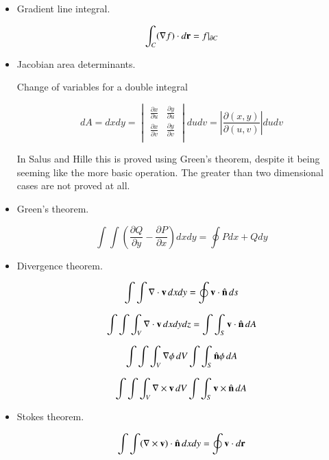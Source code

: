 \documentclass{article}
\newcommand{\grad}[0]{\nabla}
\newcommand{\PD}[2]{\frac{\partial {#2}}{\partial {#1}}}
\newcommand{\Abs}[1]{\left\lvert{#1}\right\rvert}
\begin{document}
\begin{itemize}

\item Gradient line integral. 

\begin{equation}\label{eqn:lineintegral}
\int_C (\grad f) \cdot d\Br = f \vert_{\partial C}
\end{equation}

\item Jacobian area determinants. 

Change of variables for a double integral

\begin{equation}
dA = dx dy =
\begin{vmatrix}
\PD{u}{x} & \PD{u}{y} \\
\PD{v}{x} & \PD{v}{y} \\
\end{vmatrix}
du dv
= \Abs{ \PD{(u,v)}{(x,y)} } du dv
\end{equation}

In Salus and Hille this is proved using Green's theorem, despite it 
being seeming like the more basic operation.  The greater than two
dimensional cases are not proved at all.

\item Green's theorem. 

\begin{equation}\label{eqn:greens}
\int\int \left(\PD{y}{Q} - \PD{x}{P}\right) dx dy = \oint P dx + Q dy
\end{equation}

\item Divergence theorem. 

\begin{equation}\label{eqn:divergenceplane}
\int\int \grad \cdot \Bv\, dx dy = \oint \Bv \cdot \ncap\, ds
\end{equation}

\begin{equation}\label{eqn:divergencevolume}
\int\int\int_V \grad \cdot \Bv\, dx dy dz = \int\int_S \Bv \cdot \ncap\, dA
\end{equation}

\begin{equation}\label{eqn:divergencegrad}
\int\int\int_V \grad \phi\, dV \int\int_S \ncap \phi\, dA
\end{equation}

\begin{equation}\label{eqn:divergencegradcross}
\int\int\int_V \grad \cross \Bv\, dV \int\int_S \Bv \cross \ncap\, dA
\end{equation}

\item Stokes theorem. 

\begin{equation}\label{eqn:stokes}
\int\int (\grad \cross \Bv) \cdot \ncap\, dx dy = \oint \Bv \cdot d\Br
\end{equation}

\end{itemize}
\end{document}
